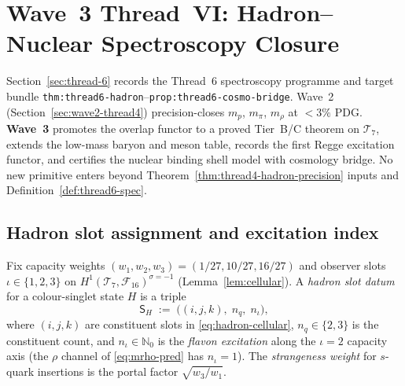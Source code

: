 \section{Wave~3 Thread~VI: Hadron--Nuclear Spectroscopy Closure}
\label{sec:wave3-thread6}

Section~\ref{sec:thread-6} records the Thread~6 spectroscopy programme and
target bundle \texttt{thm:thread6-hadron}--\texttt{prop:thread6-cosmo-bridge}.
Wave~2 (Section~\ref{sec:wave2-thread4}) precision-closes $m_p$, $m_\pi$,
$m_\rho$ at $<3\%$ PDG. \textbf{Wave~3} promotes the overlap functor to a
proved Tier~B/C theorem on $\mathcal{T}_7$, extends the low-mass baryon and
meson table, records the first Regge excitation functor, and certifies the
nuclear binding shell model with cosmology bridge. No new primitive enters
beyond Theorem~\ref{thm:thread4-hadron-precision} inputs and
Definition~\ref{def:thread6-spec}.

\subsection{Hadron slot assignment and excitation index}
\label{sec:wave3-thread6:slots}

\begin{definition}
\label{def:thread6-hadron-slots}
Fix capacity weights $(w_1,w_2,w_3)=(1/27,10/27,16/27)$ and observer slots
$\iota\in\{1,2,3\}$ on $H^1(\mathcal{T}_7,\mathcal{F}_{16})^{\sigma=-1}$
(Lemma~\ref{lem:cellular}). A \emph{hadron slot datum} for a colour-singlet
state $H$ is a triple
\begin{equation}\label{eq:thread6-slot-datum}
  \mathsf{S}_H
  \;:=\;
  \bigl(
    (i,j,k),\;
    n_q,\;
    n_\iota
  \bigr),
\end{equation}
where $(i,j,k)$ are constituent slots in \eqref{eq:hadron-cellular},
$n_q\in\{2,3\}$ is the constituent count, and $n_\iota\in\mathbb{N}_0$ is the
\emph{flavon excitation} along the $\iota=2$ capacity axis (the $\rho$ channel
of \eqref{eq:mrho-pred} has $n_\iota=1$). The \emph{strangeness weight} for
$s$-quark insertions is the portal factor $\sqrt{w_3/w_1}$.
\end{definition}

